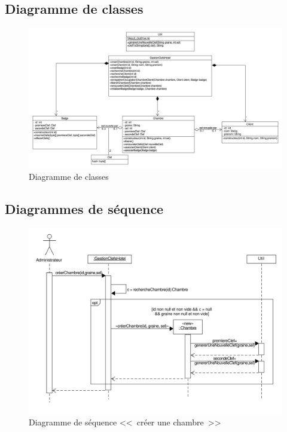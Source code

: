 \documentclass[11pt,article]{article}
\begin{document}
\subsection{Diagramme de classes}

\begin{figure}[h!]
\begin{center}
\includegraphics[scale=0.4]{DiagrammesDeClasses/gestionclefshotel_uml_diag_classes}
\caption{Diagramme de classes}
\end{center}
\label{umlet_diag_classes}
\end{figure}

\newpage

\subsection{Diagrammes de séquence}

\begin{figure}[h!]
\begin{center}
\includegraphics[scale=0.5]{DiagrammesDeSequence/gestionclefshotel_uml_diag_seq_creer_chambre}
\caption{Diagramme de séquence <<~créer une chambre~>>}
\end{center}
\label{umlet_diag_classes}
\end{figure}
\end{document}
